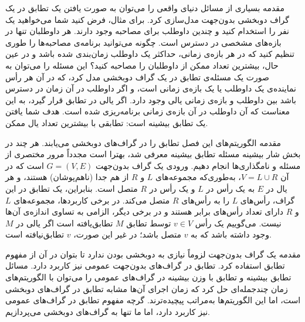 \begin{itemframe}{مقدمه}
\itm
بسیاری از مسائل دنیای واقعی را می‌توان به صورت یافتن یک تطابق در یک گراف دوبخشی بدون‌جهت مدل‌سازی کرد.
\itm
برای مثال، فرض کنید شما می‌خواهید یک نفر را استخدام کنید و چندین داوطلب برای مصاحبه وجود دارند.
هر داوطلبان تنها در بازه‌های مشخصی در دسترس است. چگونه می‌توانید برنامه‌ی مصاحبه‌ها را طوری تنظیم کنید که در هر بازه‌ی زمانی، حداکثر یک داوطلب زمان‌بندی شده باشد و در عین حال، بیشترین تعداد ممکن از داوطلبان را مصاحبه کنید؟
\itm
 این مسئله را می‌توان به صورت یک مسئله‌ی تطابق در یک گراف دو‌بخشی مدل کرد، که در آن هر رأس نماینده‌ی یک داوطلب یا یک بازه‌ی زمانی است، و اگر داوطلب در آن زمان در دسترس باشد بین داوطلب و بازه‌ی زمانی یالی وجود دارد.
\itm
اگر یالی در تطابق قرار گیرد، به این معناست که آن داوطلب در آن بازه‌ی زمانی برنامه‌ریزی شده است. هدف شما یافتن یک تطابق بیشینه است: تطابقی با بیشترین تعداد یال ممکن.
\end{itemframe}


\begin{itemframe}{مقدمه}
\itm
الگوریتم‌های این فصل تطابق را در گراف‌های دو‌بخشی می‌یابند. هر چند در بخش شار بیشینه مسئله تطابق بیشینه معرفی شد، بهترا است مجدداً مرور مختصری از مسئله و نامگذاری‌ها انجام دهیم.
\itm
ورودی یک گراف بدون‌جهت $G = (V, E)$ است که در آن $V = L \cup R$، به‌طوری‌که مجموعه‌های $L$ و $R$ از هم جدا (ناهم‌پوشان) هستند، و هر یال در $E$ به یک رأس در $L$ و یک رأس در $R$ متصل است. بنابراین، یک تطابق در این گراف، رأس‌های $L$ را به رأس‌های $R$ متصل می‌کند.
\itm
در برخی کاربردها، مجموعه‌های $L$ و $R$ دارای تعداد رأس‌های برابر هستند و در برخی دیگر، الزامی به تساوی اندازه‌ی آن‌ها نیست.
\itm
می‌گوییم یک رأس $v \in V$ توسط تطابق $M$ تطابق‌یافته
 است اگر یالی در $M$ وجود داشته باشد که به $v$ متصل باشد؛ در غیر این صورت، $v$ تطابق‌نیافته
 است.
\end{itemframe}


\begin{itemframe}{مقدمه}
\itm
یک گراف بدون‌جهت لزوماً نیازی به دو‌بخشی بودن ندارد تا بتوان در آن از مفهوم تطابق استفاده کرد. تطابق در گراف‌های بدون‌جهت عمومی نیز کاربرد دارد.
\itm
مسائل تطابق بیشینه و تطابق با وزن بیشینه در گراف‌های عمومی را می‌توان با الگوریتم‌های زمان چندجمله‌ای حل کرد که زمان اجرای آن‌ها مشابه تطابق در گراف‌های دو‌بخشی است، اما این الگوریتم‌ها به‌مراتب پیچیده‌ترند.
\itm
 گرچه مفهوم تطابق در گراف‌های عمومی نیز کاربرد دارد، اما ما تنها به گراف‌های دو‌بخشی می‌پردازیم.
\end{itemframe}
